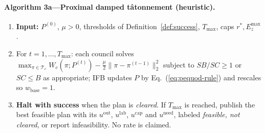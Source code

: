 \documentclass[10pt,twoside,openany]{book}
\theoremstyle{dpepstyle}
\begin{document}
\paragraph{Algorithm 3a---Proximal damped t\^atonnement (heuristic).}
\begin{enumerate}[leftmargin=1.6em,itemsep=1pt]
  \item \textbf{Input:} $P^{(0)}$, $\mu>0$, thresholds of Definition~\ref{def:success}, $T_{\max}$, caps $r^*,E_z^{\max}$.
  \item For $t=1,\dots,T_{\max}$: each council solves $\max_{\pi\in\mathcal{T}_c} W_c(\pi;P^{(t)}) - \tfrac{\mu}{2}\|\pi-\pi^{(t-1)}\|_2^2$ subject to $SB/SC\ge 1$ or $SC\le B$ as appropriate; IFB updates $P$ by Eq.~(\ref{eq:pequod-rule}) and rescales so $w_{\text{base}}=1$.
  \item \textbf{Halt with success} when the plan is \emph{cleared}. If $T_{\max}$ is reached, publish the best feasible plan with its $u^{\text{out}}$, $u^{\text{lab}}$, $u^{\text{cap}}$ and $u^{\text{need}}$, labeled \emph{feasible, not cleared}, or report infeasibility. No rate is claimed.
\end{enumerate}
\end{document}
